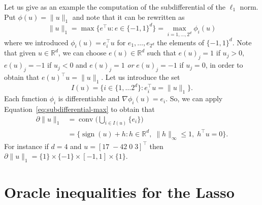 \documentclass[
	fontsize=11pt, %
	twoside=false, %
	numbers=noenddot, %
]{kaobook}
\newcommand{\R}{\mathbb R}
\newcommand{\grad}{\nabla}
\newcommand{\norm}[1]{\| #1 \|}
\DeclareMathOperator{\conv}{conv}
\DeclareMathOperator{\sign}{sign}
\begin{document}
Let us give as an example the computation of the subdifferential of the $\ell_1$ norm.
Put $\phi(u) = \norm{u}_1$ and note that it can be rewritten as
\begin{equation*}
	\norm{u}_1 = \max \big\{ e^\top u : e \in \{ -1, 1 \}^d \big\} = \max_{i=1, \ldots, 2^d} \phi_i(u)
\end{equation*}
where we introduced $\phi_i(u) = e_i^\top u$ for $e_1, \ldots, e_{2^d}$ the elements of $\{ -1, 1 \}^d$.
Note that given $u \in \R^d$, we can choose $e(u) \in \R^d$ such that $e(u)_j = 1$ if $u_j > 0$, $e(u)_j = -1$ if $u_j < 0$ and $e(u)_j = 1$ \emph{or} $e(u)_j = -1$ if $u_j = 0$, in order to obtain that $e(u)^\top u = \norm{u}_1$.
Let us introduce the set
\begin{equation*}
	I(u) = \big\{ i \in \{ 1, \ldots 2^d \} : e_i^\top u = \norm{u}_1 \big\}.
\end{equation*}
Each function $\phi_i$ is differentiable and $\grad \phi_i(u) = e_i$. 
So, we can apply Equation~\eqref{eq:subdifferential-max} to obtain that
\begin{equation}
	\label{eq:subdifferential-l1}
	\begin{split}
	\partial \norm{u}_1 &= \conv\Big( \bigcup_{i \in I(u)} \{ e_i \} \Big) \\
	&= \big\{ \sign(u) + h : h \in \R^d, \; \norm{h}_\infty \leq 1, \; h^\top u = 0 
	\big\}.
	\end{split}
\end{equation}
For instance if $d = 4$ and $u = [17 \; -42 \; 0 \; 3]^\top$ then $\partial \norm{u}_1 = \{ 1 \} \times \{ -1 \} \times [-1, 1] \times \{ 1 \}$.

\section{Oracle inequalities for the Lasso} %
\end{document}
